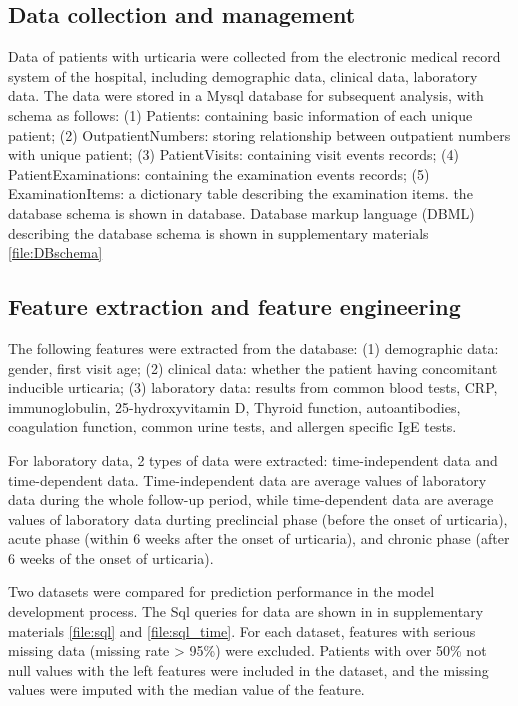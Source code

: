 \documentclass[final,3p,times,authoryear]{elsarticle}
\begin{document}
\subsection{Data collection and management}\label{Data}

Data of patients with urticaria were collected from the electronic medical record system of the hospital, including demographic data, clinical data, laboratory data. The data were stored in a Mysql database for subsequent analysis, with schema as follows: (1) Patients: containing basic information of each unique patient; (2) OutpatientNumbers: storing relationship between outpatient numbers with unique patient; (3) PatientVisits: containing visit events records; (4) PatientExaminations: containing the examination events records; (5) ExaminationItems: a dictionary table describing the examination items. the database schema is shown in database. Database markup language (DBML) describing the database schema is shown in supplementary materials \ref{file:DBschema}


\subsection{Feature extraction and feature engineering}\label{FeatureEngineering}
The following features were extracted from the database: (1) demographic data: gender, first visit age; (2) clinical data: whether the patient having concomitant inducible urticaria; (3) laboratory data: results from common blood tests, CRP, immunoglobulin, 25-hydroxyvitamin D, Thyroid function, autoantibodies, coagulation function, common urine tests, and allergen specific IgE tests. 

For laboratory data, 2 types of data were extracted: time-independent data and time-dependent data. Time-independent data are average values of laboratory data during the whole follow-up period, while time-dependent data are average values of laboratory data durting preclincial phase (before the onset of urticaria), acute phase (within 6 weeks after the onset of urticaria), and chronic phase (after 6 weeks of the onset of urticaria). 

Two datasets were compared for prediction performance in the model development process. The Sql queries for data are shown in in supplementary materials \ref{file:sql} and \ref{file:sql_time}. For each dataset, features with serious missing data (missing rate > 95\%) were excluded. Patients with over 50\% not null values with the left features were included in the dataset, and the missing values were imputed with the median value of the feature.
\end{document}
